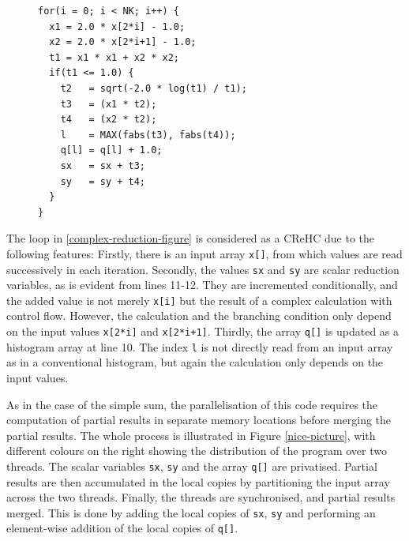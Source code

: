 \begin{figure}[h]
\begin{lstlisting}[language=MyCpp,label={complex-reduction-figure},caption=
   {Example of a Complex Reduction and Histogram Computation:
    The bottleneck from NAS Parallel Benchmarks can be parallelised as a
    reduction by privatising variables \texttt{sx}, \texttt{sy},
    \texttt{q[]}.}]
for(i = 0; i < NK; i++) {
  x1 = 2.0 * x[2*i] - 1.0;
  x2 = 2.0 * x[2*i+1] - 1.0;
  t1 = x1 * x1 + x2 * x2;
  if(t1 <= 1.0) {
    t2   = sqrt(-2.0 * log(t1) / t1);
    t3   = (x1 * t2);
    t4   = (x2 * t2);
    l    = MAX(fabs(t3), fabs(t4));
    q[l] = q[l] + 1.0;
    sx   = sx + t3;
    sy   = sy + t4;
  }
}
\end{lstlisting}
\end{figure}

    The loop in \ref{complex-reduction-figure} is considered as a
    CReHC due to the following features:
    Firstly, there is an input array \texttt{x[]}, from which values are read
    successively in each iteration.
    Secondly, the values \texttt{sx} and \texttt{sy} are scalar reduction
    variables, as is evident from lines 11-12.
    They are incremented conditionally, and the added value is not merely
    \texttt{x[i]} but the result of a complex calculation with control flow.
    However, the calculation and the branching condition only depend on the
    input values \texttt{x[2*i]} and \texttt{x[2*i+1]}.
    Thirdly, the array \texttt{q[]} is updated as a histogram array at line 10.
    The index \texttt{l} is not directly read from an input array as in a
    conventional histogram, but again the calculation only depends on the input
    values.

    As in the case of the simple sum, the parallelisation of this code
    requires the computation of partial results in separate memory locations
    before merging the partial results.
    The whole process is illustrated in Figure \ref{nice-picture}, with
    different colours on the right showing the distribution of the program
    over two threads.
    The scalar variables \texttt{sx}, \texttt{sy} and the array \texttt{q[]} are
    privatised.
    Partial results are then accumulated in the local copies by partitioning the
    input array across the two threads. 
    Finally, the threads are synchronised, and partial results merged.
    This is done by adding the local copies of \texttt{sx}, \texttt{sy}
    and performing an element-wise addition of the local copies of \texttt{q[]}. 

